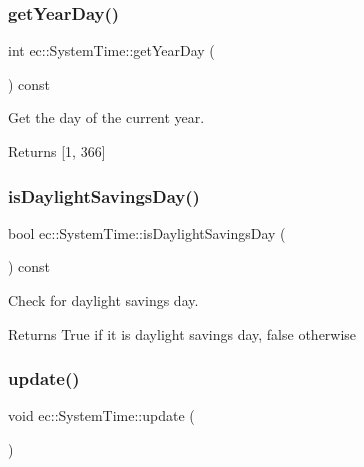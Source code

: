 \subsubsection{\texorpdfstring{get\+Year\+Day()}{getYearDay()}}
{\footnotesize\ttfamily int ec\+::\+System\+Time\+::get\+Year\+Day (\begin{DoxyParamCaption}{ }\end{DoxyParamCaption}) const}



Get the day of the current year. 

\begin{DoxyReturn}{Returns}
\mbox{[}1, 366\mbox{]} 
\end{DoxyReturn}
\mbox{\label{classec_1_1_system_time_abe57dcc7983076e92b7d8b3d32c021bf}} 
\subsubsection{\texorpdfstring{is\+Daylight\+Savings\+Day()}{isDaylightSavingsDay()}}
{\footnotesize\ttfamily bool ec\+::\+System\+Time\+::is\+Daylight\+Savings\+Day (\begin{DoxyParamCaption}{ }\end{DoxyParamCaption}) const}



Check for daylight savings day. 

\begin{DoxyReturn}{Returns}
True if it is daylight savings day, false otherwise 
\end{DoxyReturn}
\mbox{\label{classec_1_1_system_time_a2d16742bb2de689d907fff3ca0b2cfca}} 
\subsubsection{\texorpdfstring{update()}{update()}}
{\footnotesize\ttfamily void ec\+::\+System\+Time\+::update (\begin{DoxyParamCaption}{ }\end{DoxyParamCaption})}



